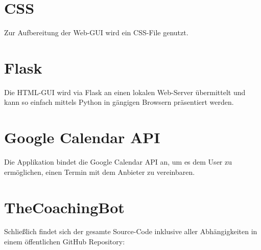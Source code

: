 \section{CSS}
Zur Aufbereitung der Web-GUI wird ein CSS-File genutzt.

\section{Flask}
Die HTML-GUI wird via Flask \cite{flask} an einen lokalen Web-Server übermittelt und kann so einfach mittels Python in gängigen Browsern präsentiert werden.


\section{Google Calendar API}
Die Applikation bindet die Google Calendar API \cite{googleCalAPI} an, um es dem User zu ermöglichen, einen Termin mit dem Anbieter zu vereinbaren.


\section{TheCoachingBot}
Schließlich findet sich der gesamte Source-Code inklusive aller Abhängigkeiten in einem öffentlichen GitHub Repository: \cite{repo} 